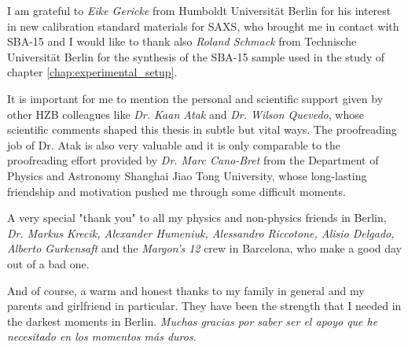 \noindent I am grateful to \emph{Eike Gericke} from Humboldt Universität Berlin for his interest in new calibration standard materials for SAXS, who brought me in contact with SBA-15 and I would like to thank also \emph{Roland Schmack} from Technische Universität Berlin for the synthesis of the SBA-15 sample used in the study of chapter \ref{chap:experimental_setup}.
\vspace{2ex}

\noindent It is important for me to mention the personal and scientific support given by other HZB colleagues like \emph{Dr. Kaan Atak} and \emph{Dr. Wilson Quevedo}, whose scientific comments shaped this thesis in subtle but vital ways. The proofreading job of Dr. Atak is also very valuable and it is only comparable to the proofreading effort provided by \emph{Dr. Marc Cano-Bret} from the Department of Physics and Astronomy Shanghai Jiao Tong University, whose long-lasting friendship and motivation pushed me through some difficult moments.
\vspace{2ex}

\noindent A very special "thank you" to all my physics and non-physics friends in Berlin, \emph{Dr. Markus Krecik, Alexander Humeniuk, Alessandro Riccotone, Alisio Delgado, Alberto Gurkensaft} and the \emph{Margon's 12} crew in Barcelona, who make a good day out of a bad one.
\vspace{2ex}

\noindent And of course, a warm and honest thanks to my family in general and my parents and girlfriend in particular. They have been the strength that I needed in the darkest moments in Berlin. \emph{Muchas gracias por saber ser el apoyo que he necesitado en los momentos m\'{a}s duros}.

\cleardoublepage
